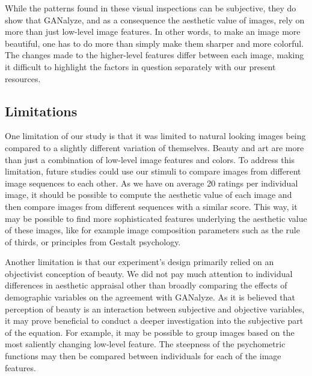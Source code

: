 \documentclass[../main.tex]{subfiles}
\begin{document}
While the patterns found in these visual inspections can be subjective, they do show that GANalyze, and as a consequence the aesthetic value of images, rely on more than just low-level image features. In other words, to make an image more beautiful, one has to do more than simply make them sharper and more colorful. The changes made to the higher-level features differ between each image, making it difficult to highlight the factors in question separately with our present resources.

\subsection{Limitations}
One limitation of our study is that it was limited to natural looking images being compared to a slightly different variation of themselves. Beauty and art are more than just a combination of low-level image features and colors. To address this limitation, future studies could use our stimuli to compare images from different image sequences to each other. As we have on average 20 ratings per individual image, it should be possible to compute the aesthetic value of each image and then compare images from different sequences with a similar score. This way, it may be possible to find more sophisticated features underlying the aesthetic value of these images, like for example image composition parameters such as the rule of thirds, or principles from Gestalt psychology.

Another limitation is that our experiment's design primarily relied on an objectivist conception of beauty. We did not pay much attention to individual differences in aesthetic appraisal other than broadly comparing the effects of demographic variables on the agreement with GANalyze. As it is believed that perception of beauty is an interaction between subjective and objective variables, it may prove beneficial to conduct a deeper investigation into the subjective part of the equation. For example, it may be possible to group images based on the most saliently changing low-level feature. The steepness of the psychometric functions may then be compared between individuals for each of the image features.


\end{document}
